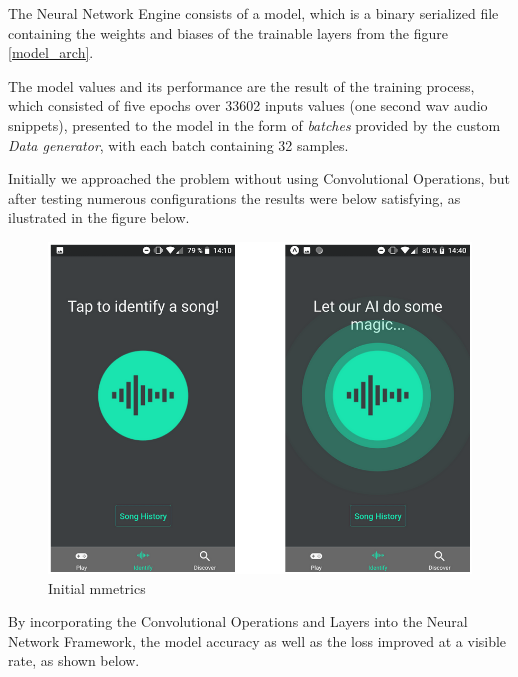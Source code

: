The Neural Network Engine consists of a model, which is a binary serialized file containing the weights and biases
of the trainable layers from the figure \ref{model_arch}.

The model values and its performance are the result of the training process, which consisted of five epochs over 33602
inputs values (one second wav audio snippets), presented to the model in the form of \textit{batches} provided
by the custom \textit{Data generator}, with each batch containing 32 samples.

Initially we approached the problem without using Convolutional Operations, but after testing numerous configurations
the results were below satisfying, as ilustrated in the figure below.


\begin{figure}[H]
	\centering
	\includegraphics{images/spektrum.png}
	\caption{Initial mmetrics}
\label{bad_metrics}
\end{figure}


By incorporating the Convolutional Operations and Layers into the Neural Network Framework, the model accuracy as well
as the loss improved at a visible rate, as shown below.


